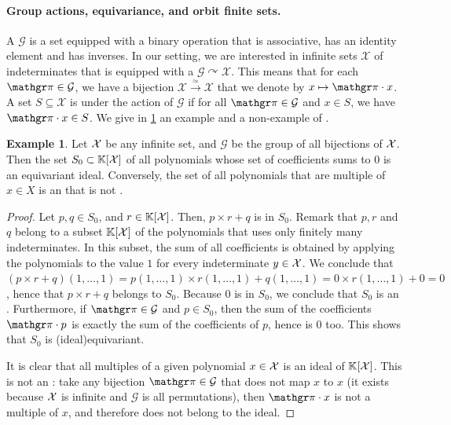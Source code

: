 \documentclass[11pt,a4paper,twosided]{article}
\theoremstyle{definition}
\newtheorem{example}[theorem]{Example}
\newcommand{\tobij}{\stackrel{\simeq}{\longrightarrow}}
\newcommand{\K}{\mathbb{K}}
\newcommand{\X}{\mathcal{X}}
\newcommand{\poly}[2]{#1[#2]}
\newcommand{\group}{\mathcal{G}}
\newcommand{\actson}{\curvearrowright}
\begin{document}
\paragraph{Group actions, equivariance, and orbit finite sets.}  \AP A
 $\group$ is a set equipped with a binary operation that is
associative, has an identity element and has inverses. In our setting, we are
interested in infinite sets $\X$ of indeterminates that is equipped with a
 $\group \actson \X$. This means that for each $\gelem \in
\group$, we have a bijection $\X \tobij \X$ that we denote by $x \mapsto \gelem
\cdot x$. A set $S \subseteq \X$ is  under the action of
$\group$ if for all $\gelem \in \group$ and $x \in S$, we have $\gelem \cdot x
\in S$. We give in \cref{ex:idl-equiv} an example and a non-example
of .

\begin{example}
    \label{ex:idl-equiv}
    Let $\mathcal{X}$ be any infinite set, and $\group$ be the 
    group of all bijections of $\mathcal{X}$. 
    Then the set $S_0 \subset \poly{\K}{\Indets}$ of all polynomials 
    whose set of coefficients sums to $0$ is an equivariant ideal.
    Conversely, the set of all polynomials that are multiple
    of $x \in X$ is an  that is not .
\end{example}
\begin{proof}
    Let $p,q\in S_0$, and $r \in \poly{\K}{\Indets}$.
    Then, $p \times r + q$ is in $S_0$. Remark that 
    $p,r$ and $q$ belong to a subset $\poly{\K}{\Indets}$ of the 
    polynomials that uses only finitely many indeterminates.
    In this subset, the sum of all coefficients is obtained
    by applying the polynomials to the value $1$ for every indeterminate
    $y \in \mathcal{X}$. We conclude that
    $(p \times r + q)(1,\dots, 1) 
    = p(1,\dots,1) \times r(1,\dots,1) + q(1,\dots,1)
    = 0 \times r(1, \dots, 1) + 0 = 0$, hence that
    $p \times r + q$ belongs to $S_0$. 
    Because $0$ is in $S_0$, we conclude that $S_0$ is an .
    Furthermore, if $\gelem \in \group$ and $p \in S_0$, then
    the sum of the coefficients $\gelem \cdot p$ is exactly
    the sum of the coefficients of $p$, hence is $0$ too.
    This shows that $S_0$ is \kl(ideal){equivariant}.

    It is clear that all multiples of a given polynomial $x \in \mathcal{X}$
    is an ideal of $\poly{\K}{\Indets}$. This is not an :
    take any bijection $\gelem \in \group$ that does not map $x$ to $x$ (it
    exists because $\mathcal{X}$ is infinite and $\group$ is all permutations),
    then $\gelem \cdot x$ is not a multiple of $x$, and therefore does 
    not belong to the ideal.
\end{proof}
\end{document}
